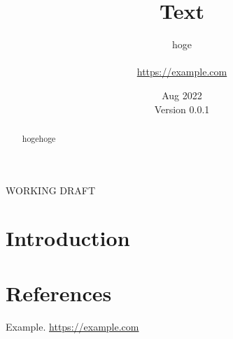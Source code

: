 \documentclass[]{article}
\title{Text \bigskip}
\author{
  \parbox{0.75\linewidth}{
    \centering
    \mbox{hoge}
  } \medskip \\
  \normalsize \url{https://example.com} \medskip
}
\date{
  Aug 2022 \\
  Version 0.0.1
}
\makeatletter
\DeclareRobustCommand{\_}{%
  \leavevmode\vbox{%
    \hrule\@width.5em
          \@height-.26ex
          \@depth\dimexpr.26ex+.28pt\relax}}
\makeatother
\begin{document}
\maketitle

\begin{center}WORKING DRAFT\end{center}

\bigskip

\begin{abstract}
hogehoge
\end{abstract}

\newpage

\tableofcontents

\newpage


\hypertarget{introduction}{%
\section{Introduction}\label{introduction}}

\clearpage

\hypertarget{references}{%
\section*{References}\label{references}}

\begin{enumerate}[label={[\arabic*]},itemsep=0.4\baselineskip]
\item Example. \url{https://example.com}
\end{enumerate}
\end{document}
